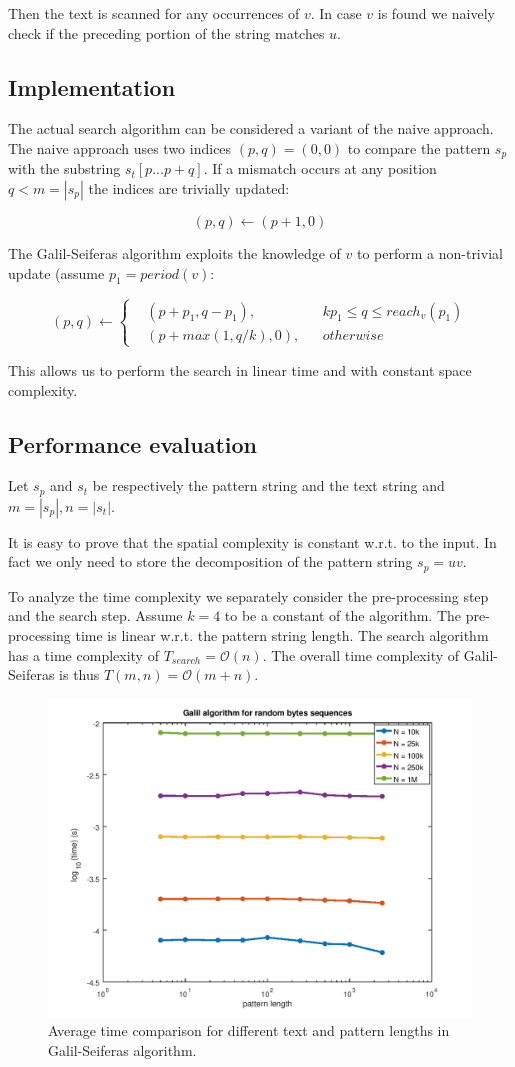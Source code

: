 \documentclass{article}
\begin{document}
Then the text is scanned for any occurrences of $v$. In case $v$ is found we naively check if the preceding portion of the string matches $u$.

\subsection{Implementation}
The actual search algorithm can be considered a variant of the naive approach. The naive approach uses two indices $(p, q) = (0, 0)$ to compare the pattern $s_p$ with the substring $s_t[p ... p + q]$. If a mismatch occurs at any position $q < m = |s_p|$ the indices are trivially updated:

$$(p, q) \leftarrow (p + 1, 0)$$

The Galil-Seiferas algorithm exploits the knowledge of $v$ to perform a non-trivial update (assume $p_1 = period(v)$:

\begin{equation*}
(p, q) \leftarrow
\left\{\begin{alignedat}{2}
& (p + p_1, q - p_1), && kp_1 \le q \le reach_v(p_1) \\
& (p + max(1, q / k), 0), && otherwise
\end{alignedat}\right.             
\end{equation*}

This allows us to perform the search in linear time and with constant space complexity.

\subsection{Performance evaluation}
Let $s_p$ and $s_t$ be respectively the pattern string and the text string and $m = |s_p|, n = |s_t|$.

It is easy to prove that the spatial complexity is constant w.r.t. to the input. In fact we only need to store the decomposition of the pattern string $s_p = uv$.

To analyze the time complexity we separately consider the pre-processing step and the search step. Assume $k = 4$ to be a constant of the algorithm. The pre-processing time is linear w.r.t. the pattern string length. The search algorithm has a time complexity of $T_{search} = \mathcal{O}(n)$. The overall time complexity of Galil-Seiferas is thus $T(m,n) = \mathcal{O}(m + n)$.

\begin{figure}
    \centering
    \includegraphics[width=0.5\linewidth]{galil.png}
    \caption{Average time comparison for different text and pattern lengths in Galil-Seiferas algorithm.}
\end{figure}
\end{document}
